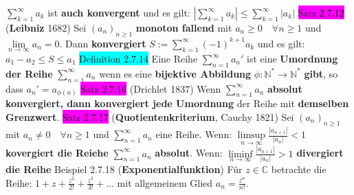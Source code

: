 \documentclass[landscape, 10pt]{article}
\newcommand{\N}{\mathbb{N}}
\newcommand{\C}{\mathbb{C}}
\begin{document}
\begin{multicols}{3}
                     \textcolor{NavyBlue}{$\sum_{k=1}^\infty a_k$}
                     ist \textbf{auch konvergent} und es gilt:
                     \textcolor{NavyBlue}{$|\sum_{k=1}^\infty a_k|\leqslant\sum_{k=1}^\infty |a_k|$}
              \colorbox{magenta}{Satz 2.7.12} (\textbf{Leibniz} 1682) Sei 
                     \textcolor{NavyBlue}{$(a_n)_{n\geqslant1}$}
                     \textbf{monoton fallend} 
                     mit \textcolor{NavyBlue}{$a_n\geqslant0\quad\forall n\geqslant1$} und 
                     \textcolor{NavyBlue}{$\lim\limits_{n\to\infty}a_n=0$}. 
                     Dann \textbf{konvergiert} 
                     \textcolor{NavyBlue}{$S:=\sum_{k=1}^\infty (-1)^{k+1}a_k$} und es gilt: 
                     \textcolor{NavyBlue}{$a_1-a_2\leqslant S\leqslant a_1$}
              \colorbox{cyan}{Definition 2.7.14} Eine Reihe \textcolor{NavyBlue}{$\sum_{n=1}^\infty a_n'$} 
                     ist eine 
                     \textbf{Umordnung der Reihe} \textcolor{NavyBlue}{$\sum_{n=1}^\infty a_n$} 
                     wenn es eine \textbf{bijektive Abbildung} 
                     \textcolor{NavyBlue}{$\phi :\N^*\longrightarrow\N^*$} 
                     \textbf{gibt}, so dass 
                     \textcolor{NavyBlue}{$a_n'=a_{\phi(n)}$}
              \colorbox{magenta}{Satz 2.7.16} (Drichlet 1837) Wenn 
                     \textcolor{NavyBlue}{$\sum_{n=1}^\infty a_n$} \textbf{absolut 
                     konvergiert, dann konvergiert jede Umordnung} der Reihe 
                     mit \textbf{demselben Grenzwert}.
              \colorbox{magenta}{Satz 2.7.17} (\textbf{Quotientenkriterium}, Cauchy 1821) Sei 
                     \textcolor{NavyBlue}{$(a_n)_{n\geqslant1}$} mit 
                     \textcolor{NavyBlue}{$a_n\neq0\quad\forall n\geqslant1$}
                     und \textcolor{NavyBlue}{$\sum_{n=1}^\infty a_n$} eine Reihe.
                     Wenn: 
                     \textcolor{NavyBlue}{$\limsup\limits_{n\to\infty}\frac{|a_{n+1}|}{|a_n|}<1$}
                     \textbf{kovergiert die Reiehe} 
                     \textcolor{NavyBlue}{$\sum_{n=1}^\infty a_n$} \textbf{absolut}.
                     Wenn: 
                     \textcolor{NavyBlue}{$\liminf\limits_{n\to\infty}\frac{|a_{n+1}|}{|a_n|}>1$}
                     \textbf{divergiert die Reihe}
              \colorbox{Dandelion}{Beispiel 2.7.18} (\textbf{Exponentialfunktion})
                     Für $z\in\C$ betrachte die Reihe:
                     $1+z+\frac{z^2}{2!}+\frac{z^3}{3!}+\dots$
                     mit allgemeinem Glied 
                     $a_n=\frac{z^n}{n!}$.

\end{multicols}
\end{document}
